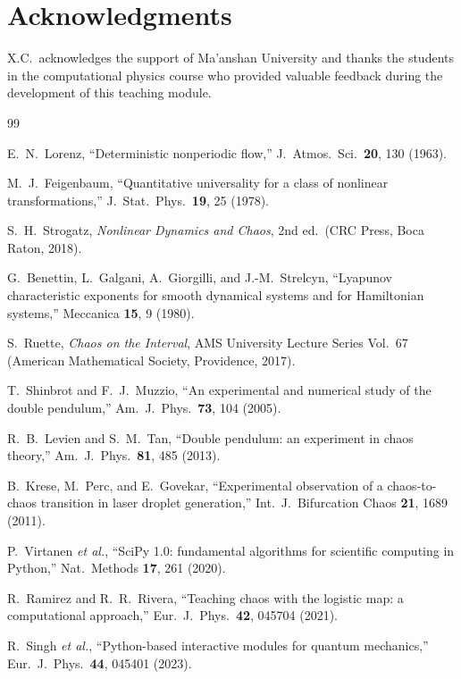 \documentclass[aps,twocolumn,showpacs]{revtex4-2}
\begin{document}
\section*{Acknowledgments}

X.C.\ acknowledges the support of Ma'anshan University and thanks the students in the computational physics
course who provided valuable feedback during the development of this teaching module.

\begin{thebibliography}{99}

E.~N.~Lorenz,
``Deterministic nonperiodic flow,''
J.\ Atmos.\ Sci.\ \textbf{20}, 130 (1963).

M.~J.~Feigenbaum,
``Quantitative universality for a class of nonlinear transformations,''
J.\ Stat.\ Phys.\ \textbf{19}, 25 (1978).

S.~H.~Strogatz,
\emph{Nonlinear Dynamics and Chaos}, 2nd ed.\ (CRC Press, Boca Raton, 2018).

G.~Benettin, L.~Galgani, A.~Giorgilli, and J.-M.~Strelcyn,
``Lyapunov characteristic exponents for smooth dynamical systems and for Hamiltonian systems,''
Meccanica \textbf{15}, 9 (1980).

S.~Ruette,
\emph{Chaos on the Interval}, AMS University Lecture Series Vol.\ 67 (American Mathematical Society,
Providence, 2017).

T.~Shinbrot and F.~J.~Muzzio,
``An experimental and numerical study of the double pendulum,''
Am.\ J.\ Phys.\ \textbf{73}, 104 (2005).

R.~B.~Levien and S.~M.~Tan,
``Double pendulum: an experiment in chaos theory,''
Am.\ J.\ Phys.\ \textbf{81}, 485 (2013).

B.~Krese, M.~Perc, and E.~Govekar,
``Experimental observation of a chaos-to-chaos transition in laser droplet generation,''
Int.\ J.\ Bifurcation Chaos \textbf{21}, 1689 (2011).

P.~Virtanen \emph{et al.},
``SciPy 1.0: fundamental algorithms for scientific computing in Python,''
Nat.\ Methods \textbf{17}, 261 (2020).

R.~Ramirez and R.~R.~Rivera,
``Teaching chaos with the logistic map: a computational approach,''
Eur.\ J.\ Phys.\ \textbf{42}, 045704 (2021).

R.~Singh \emph{et al.},
``Python-based interactive modules for quantum mechanics,''
Eur.\ J.\ Phys.\ \textbf{44}, 045401 (2023).


\end{thebibliography}
\end{document}
